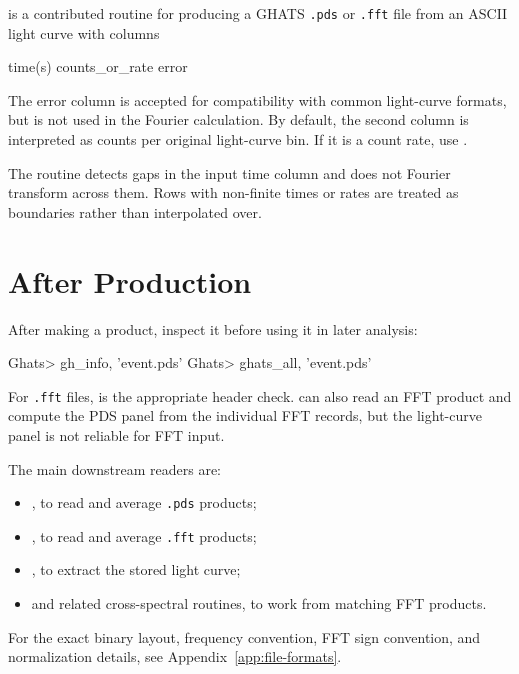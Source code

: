 is a contributed routine for producing a GHATS
\texttt{.pds} or \texttt{.fft} file from an ASCII light curve with columns

\begin{ghatsconsole}
time(s)   counts_or_rate   error
\end{ghatsconsole}

The error column is accepted for compatibility with common light-curve
formats, but is not used in the Fourier calculation.  By default, the second
column is interpreted as counts per original light-curve bin.  If it is a
count rate, use .


The routine detects gaps in the input time column and does not Fourier
transform across them.  Rows with non-finite times or rates are treated as
boundaries rather than interpolated over.

\section{After Production}

After making a product, inspect it before using it in later analysis:

\begin{ghatsconsole}
Ghats> gh_info, 'event.pds'
Ghats> ghats_all, 'event.pds'
\end{ghatsconsole}

For \texttt{.fft} files,  is the appropriate header check.
 can also read an FFT product and compute the PDS panel
from the individual FFT records, but the light-curve panel is not reliable
for FFT input.

The main downstream readers are:

\begin{itemize}
\item {}, to read and average \texttt{.pds} products;
\item {}, to read and average \texttt{.fft} products;
\item {}, to extract the stored light curve;
\item {} and related cross-spectral routines, to work from
  matching FFT products.
\end{itemize}

For the exact binary layout, frequency convention, FFT sign convention, and
normalization details, see Appendix~\ref{app:file-formats}.
